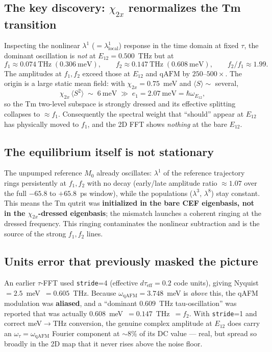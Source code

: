 \documentclass[11pt,a4paper]{article}
\newcommand{\qAFM}{\mathrm{qAFM}}
\newcommand{\EtA}{E_{12}}
\newcommand{\chitwox}{\chi_{2x}}
\begin{document}
\subsection{The key discovery: $\chitwox$ renormalizes the Tm transition}
Inspecting the nonlinear $\lambda^1$ ($=\lambda^1_{\text{local}}$) response in
the time domain at fixed $\tau$, the dominant oscillation is \emph{not} at
$\EtA=0.500$~THz but at
\begin{equation}
  f_1 \approx 0.074~\text{THz} \;(0.306~\text{meV}),\qquad
  f_2 \approx 0.147~\text{THz} \;(0.608~\text{meV}),\qquad f_2/f_1\approx 1.99 .
\end{equation}
The amplitudes at $f_1,f_2$ exceed those at $\EtA$ and $\qAFM$ by
$250$--$500\times$. The origin is a large static mean field: with
$\chitwox=0.75$~meV and $\langle S\rangle\sim$ several,
\begin{equation}
  \chitwox\,\langle S^2\rangle \;\sim\; 6~\text{meV}
  \;\gg\; e_1 = 2.07~\text{meV} = \hbar\omega_{\EtA},
\end{equation}
so the Tm two-level subspace is strongly dressed and its effective splitting
collapses to $\approx f_1$. Consequently the spectral weight that ``should''
appear at $\EtA$ has physically moved to $f_1$, and the 2D FFT shows
\emph{nothing} at the bare $\EtA$.

\subsection{The equilibrium itself is not stationary}
The unpumped reference $M_0$ already oscillates: $\lambda^1$ of the reference
trajectory rings persistently at $f_1,f_2$ with no decay (early/late amplitude
ratio $\approx 1.07$ over the full $-65.8$ to $+65.8$~ps window), while the
populations ($\lambda^3$, $\lambda^8$) stay constant. This means the Tm qutrit
was \textbf{initialized in the bare CEF eigenbasis, not in the
$\chitwox$-dressed eigenbasis}; the mismatch launches a coherent ringing at the
dressed frequency. This ringing contaminates the nonlinear subtraction and is
the source of the strong $f_1,f_2$ lines.

\subsection{Units error that previously masked the picture}
An earlier $\tau$-FFT used \texttt{stride}=4 (effective
$d\tau_{\text{eff}}=0.2$ code units), giving Nyquist $=2.5$~meV~$=0.605$~THz.
Because $\omega_{\qAFM}=3.748$~meV is \emph{above} this, the qAFM modulation was
\textbf{aliased}, and a ``dominant $0.609$~THz tau-oscillation'' was reported
that was actually $0.608$~meV~$=0.147$~THz~$=f_2$. With \texttt{stride}=1 and
correct meV$\to$THz conversion, the genuine complex amplitude at
$\EtA$ does carry an $\omega_\tau=\omega_{\qAFM}$ Fourier component at
$\sim 8\%$ of its DC value --- real, but spread so broadly in the 2D map that it
never rises above the noise floor.
\end{document}
